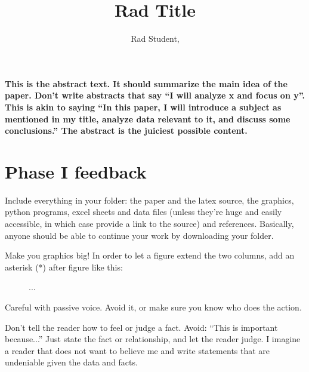 \documentclass[fontsize=11pt, twocolumn]{article}
\title{Rad Title} %
\author{Rad Student, } %
\date{} %
\begin{document}
\maketitle %

\thispagestyle{fancy} %


\noindent \textbf{This is the abstract text. It should summarize the main idea of the paper. Don't write abstracts that say ``I will analyze x and focus on y''. This is akin to saying ``In this paper, I will introduce a subject as mentioned in my title, analyze data relevant to it, and discuss some conclusions.'' The abstract is the juiciest possible content.}


\section*{Phase I feedback}
Include everything in your folder: the paper and the latex source, the graphics, python programs, excel sheets and data files (unless they're huge and easily accessible, in which case provide a link to the source) and references. Basically, anyone should be able to continue your work by downloading your folder.

Make you graphics big! In order to let a figure extend the two columns, add an asterisk (*) after figure like this:
\begin{verbatim*}
\begin{figure}
...
\end{figure}
\end{verbatim*}



Careful with passive voice. Avoid it, or make sure you know who does the action.

Don't tell the reader how to feel or judge a fact. Avoid: ``This is important because...'' Just state the fact or relationship, and let the reader judge. I imagine a reader that does not want to believe me and write statements that are undeniable given the data and facts.
\end{document}
